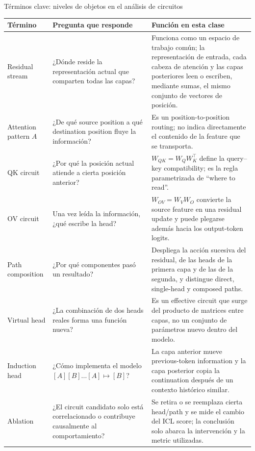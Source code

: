 \begin{knowledgebox}{Términos clave: niveles de objetos en el análisis de circuitos}
\small
\begin{tabularx}{\textwidth}{L{0.22\textwidth}L{0.28\textwidth}X}
\toprule
Término & Pregunta que responde & Función en esta clase \\
\midrule
Residual stream & ¿Dónde reside la representación actual que comparten todas las capas? & Funciona como un espacio de trabajo común; la representación de entrada, cada cabeza de atención y las capas posteriores leen o escriben, mediante sumas, el mismo conjunto de vectores de posición. \\
Attention pattern $A$ & ¿De qué source position a qué destination position fluye la información? & Es un position-to-position routing; no indica directamente el contenido de la feature que se transporta. \\
QK circuit & ¿Por qué la posición actual atiende a cierta posición anterior? & $W_{QK}=W_QW_K^{\top}$ define la query--key compatibility; es la regla parametrizada de ``where to read''. \\
OV circuit & Una vez leída la información, ¿qué escribe la head? & $W_{OV}=W_VW_O$ convierte la source feature en una residual update y puede plegarse además hacia los output-token logits. \\
Path composition & ¿Por qué componentes pasó un resultado? & Despliega la acción sucesiva del residual, de las heads de la primera capa y de las de la segunda, y distingue direct, single-head y composed paths. \\
Virtual head & ¿La combinación de dos heads reales forma una función nueva? & Es un effective circuit que surge del producto de matrices entre capas, no un conjunto de parámetros nuevo dentro del modelo. \\
Induction head & ¿Cómo implementa el modelo $[A][B]\ldots[A]\mapsto[B]$? & La capa anterior mueve previous-token information y la capa posterior copia la continuation después de un contexto histórico similar. \\
Ablation & ¿El circuit candidato solo está correlacionado o contribuye causalmente al comportamiento? & Se retira o se reemplaza cierta head/path y se mide el cambio del ICL score; la conclusión solo abarca la intervención y la metric utilizadas. \\
\bottomrule
\end{tabularx}
\end{knowledgebox}

